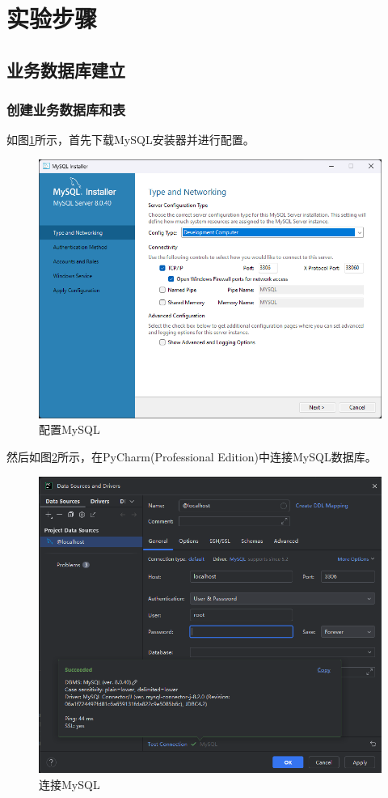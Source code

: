\section{实验步骤}
\subsection{业务数据库建立}
\subsubsection{创建业务数据库和表}

如图\ref{configure}所示，首先下载MySQL安装器并进行配置。

\begin{figure}[!htbp]
    \centering
    \includegraphics[width=\textwidth]{images/configure.png}
    \caption{配置MySQL}\label{configure}
\end{figure}

然后如图\ref{connect}所示，在PyCharm(Professional Edition)中连接MySQL数据库。

\begin{figure}[!htbp]
    \centering
    \includegraphics[width=\textwidth]{images/connect.png}
    \caption{连接MySQL}\label{connect}
\end{figure}

